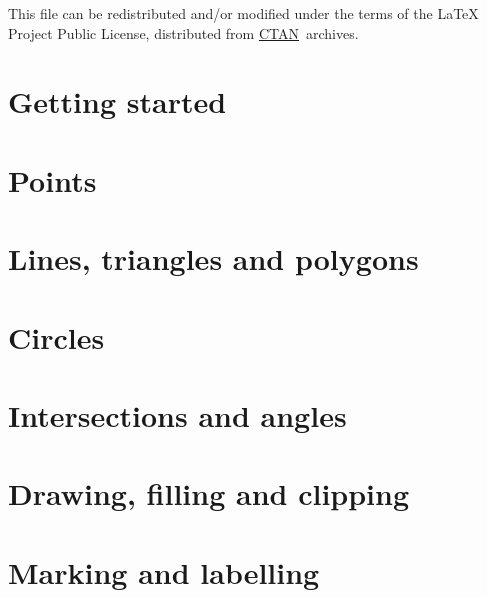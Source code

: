 \documentclass[DIV         = 14,
               fontsize    = 10,
               index       = totoc,
               twoside,
               cadre,
               headings    = small,
               ]{tkz-doc}
\begin{document}
This file can be redistributed and/or modified under the terms of the \LaTeX{}
Project Public License, distributed from \href{http://www.ctan.org/}{CTAN}\  archives.

\clearpage
\setcounter{tocdepth}{2}%
\tableofcontents
\clearpage
\newpage

\part{Getting started}





\part{Points}






\part{Lines, triangles and polygons}




\part{Circles}



\part{Intersections and angles}



\part{Drawing, filling and clipping}




\part{Marking and labelling}


\end{document}
